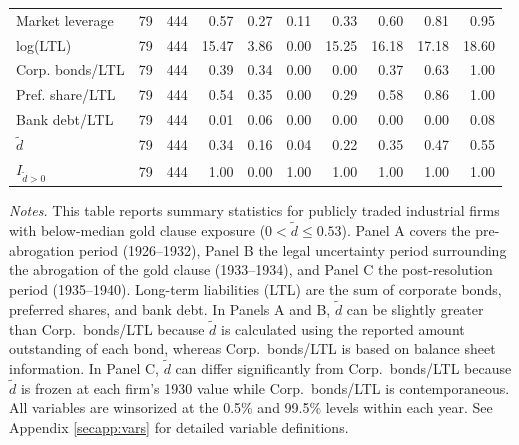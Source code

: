 \begin{table}[p]
\begin{threeparttable}
\begin{tabular}{lrrrrrrrrr}
            Market leverage & 79 & 444 & 0.57 & 0.27 & 0.11 & 0.33 & 0.60 & 0.81 & 0.95 \\
            log(LTL) & 79 & 444 & 15.47 & 3.86 & 0.00 & 15.25 & 16.18 & 17.18 & 18.60 \\
            Corp. bonds/LTL & 79 & 444 & 0.39 & 0.34 & 0.00 & 0.00 & 0.37 & 0.63 & 1.00 \\
            Pref. share/LTL & 79 & 444 & 0.54 & 0.35 & 0.00 & 0.29 & 0.58 & 0.86 & 1.00 \\
            Bank debt/LTL & 79 & 444 & 0.01 & 0.06 & 0.00 & 0.00 & 0.00 & 0.00 & 0.08 \\
            \ensuremath{\tilde{d}} & 79 & 444 & 0.34 & 0.16 & 0.04 & 0.22 & 0.35 & 0.47 & 0.55 \\
            \ensuremath{I_{\tilde{d}>0}} & 79 & 444 & 1.00 & 0.00 & 1.00 & 1.00 & 1.00 & 1.00 & 1.00 \\
            \bottomrule
        \end{tabular}
    \end{threeparttable}

    \vspace*{3mm} \justifying \noindent
\scriptsize{\textit{Notes.} This table reports summary statistics for publicly traded industrial firms with below-median gold clause exposure ($0 < \tilde{d} \leq 0.53$). Panel A covers the pre-abrogation period (1926--1932), Panel B the legal uncertainty period surrounding the abrogation of the gold clause (1933--1934), and Panel C the post-resolution period (1935--1940). Long-term liabilities (LTL) are the sum of corporate bonds, preferred shares, and bank debt. In Panels A and B, $\tilde{d}$ can be slightly greater than Corp.\ bonds/LTL because $\tilde{d}$ is calculated using the reported amount outstanding of each bond, whereas Corp.\ bonds/LTL is based on balance sheet information. In Panel C, $\tilde{d}$ can differ significantly from Corp.\ bonds/LTL because $\tilde{d}$ is frozen at each firm's 1930 value while Corp.\ bonds/LTL is contemporaneous. All variables are winsorized at the 0.5\% and 99.5\% levels within each year. See Appendix \ref{secapp:vars} for detailed variable definitions.}
\end{table}